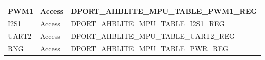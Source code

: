 \begin{longtable}[c]{|p{4cm}|p{2cm}|p{9cm}|}
    
    PWM1                  & Access & DPORT\_AHBLITE\_MPU\_TABLE\_PWM1\_REG \\
    \hline
    I2S1                  & Access & DPORT\_AHBLITE\_MPU\_TABLE\_I2S1\_REG \\
    \hline
    UART2                 & Access & DPORT\_AHBLITE\_MPU\_TABLE\_UART2\_REG \\
    \hline
    
    
    RNG               & Access & DPORT\_AHBLITE\_MPU\_TABLE\_PWR\_REG \\
    
\end{longtable}
